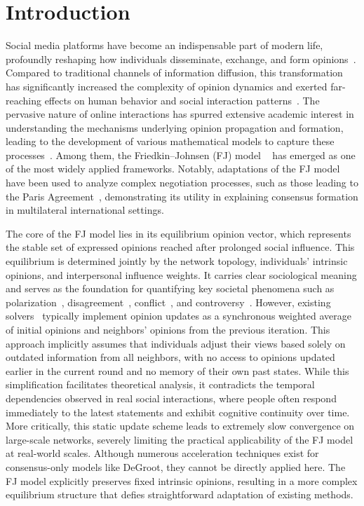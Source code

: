 \section{Introduction}
Social media platforms have become an indispensable part of modern life, profoundly reshaping how individuals disseminate, exchange, and form opinions~\cite{anderson2019recent,dong2018survey,jia2015opinion}. Compared to traditional channels of information diffusion, this transformation has significantly increased the complexity of opinion dynamics and exerted far-reaching effects on human behavior and social interaction patterns~\cite{Le20}. The pervasive nature of online interactions has spurred extensive academic interest in understanding the mechanisms underlying opinion propagation and formation, leading to the development of various mathematical models to capture these processes~\cite{jia2015opinion, PrTe17, dong2018survey, anderson2019recent}. Among them, the Friedkin–Johnsen (FJ) model ~\cite{FrJo90} has emerged as one of the most widely applied frameworks. Notably, adaptations of the FJ model have been used to analyze complex negotiation processes, such as those leading to the Paris Agreement~\cite{BeWaVaHoShAl21}, demonstrating its utility in explaining consensus formation in multilateral international settings.

The core of the FJ model lies in its equilibrium opinion vector, which represents the stable set of expressed opinions reached after prolonged social influence. This equilibrium is determined jointly by the network topology, individuals’ intrinsic opinions, and interpersonal influence weights. It carries clear sociological meaning and serves as the foundation for quantifying key societal phenomena such as polarization~\cite{matakos2017measuring,dandekar2013biased, musco2018minimizing}, disagreement~\cite{dandekar2013biased, musco2018minimizing}, conflict~\cite{chen2018quantifying}, and controversy~\cite{chen2018quantifying}. However, existing solvers~\cite{xu2021fast,neumann2024sublinear,wang2025efficient} typically implement opinion updates as a synchronous weighted average of initial opinions and neighbors’ opinions from the previous iteration. This approach implicitly assumes that individuals adjust their views based solely on outdated information from all neighbors, with no access to opinions updated earlier in the current round and no memory of their own past states. While this simplification facilitates theoretical analysis, it contradicts the temporal dependencies observed in real social interactions, where people often respond immediately to the latest statements and exhibit cognitive continuity over time. More critically, this static update scheme leads to extremely slow convergence on large-scale networks, severely limiting the practical applicability of the FJ model at real-world scales. Although numerous acceleration techniques exist for consensus-only models like DeGroot, they cannot be directly applied here. The FJ model explicitly preserves fixed intrinsic opinions, resulting in a more complex equilibrium structure that defies straightforward adaptation of existing methods.

